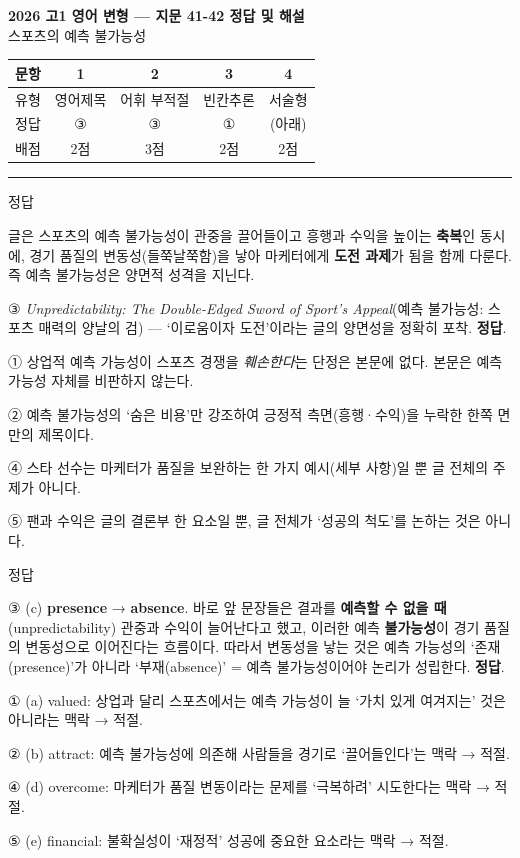 \documentclass[11pt,a4paper]{article}
\newcommand{\sol}[2]{\vspace{6pt}{\sffamily\bfseries #1} \quad 정답 \fbox{#2}\par\vspace{1pt}}
\begin{document}
\begin{center}
{\fontsize{15}{17}\selectfont\sffamily\bfseries 2026 고1 영어 변형 — 지문 41-42 정답 및 해설}\\[2pt]
{\sffamily 스포츠의 예측 불가능성}
\end{center}
\vspace{6pt}

\begin{center}
\renewcommand{\arraystretch}{1.4}
\begin{tabular}{|c|c|c|c|c|}
\hline
\sffamily 문항 & 1 & 2 & 3 & 4 \\\hline
\sffamily 유형 & \sffamily 영어제목 & \sffamily 어휘 부적절 & \sffamily 빈칸추론 & \sffamily 서술형 \\\hline
\sffamily 정답 & ③ & ③ & ① & (아래) \\\hline
\sffamily 배점 & 2점 & 3점 & 2점 & 2점 \\\hline
\end{tabular}
\end{center}
\vspace{8pt}\hrule\vspace{4pt}

\sol{1. 영어 제목}{③}
글은 스포츠의 예측 불가능성이 관중을 끌어들이고 흥행과 수익을 높이는 \textbf{축복}인 동시에, 경기 품질의 변동성(들쭉날쭉함)을 낳아 마케터에게 \textbf{도전 과제}가 됨을 함께 다룬다. 즉 예측 불가능성은 양면적 성격을 지닌다.\par
③ \textit{Unpredictability: The Double-Edged Sword of Sport's Appeal}(예측 불가능성: 스포츠 매력의 양날의 검) — `이로움이자 도전'이라는 글의 양면성을 정확히 포착. \textbf{정답}.\par
① 상업적 예측 가능성이 스포츠 경쟁을 \textit{훼손한다}는 단정은 본문에 없다. 본문은 예측 가능성 자체를 비판하지 않는다.\par
② 예측 불가능성의 `숨은 비용'만 강조하여 긍정적 측면(흥행·수익)을 누락한 한쪽 면만의 제목이다.\par
④ 스타 선수는 마케터가 품질을 보완하는 한 가지 예시(세부 사항)일 뿐 글 전체의 주제가 아니다.\par
⑤ 팬과 수익은 글의 결론부 한 요소일 뿐, 글 전체가 `성공의 척도'를 논하는 것은 아니다.

\vspace{4pt}
\sol{2. 어휘 부적절}{③}
③ (c) \textbf{presence} → \textbf{absence}. 바로 앞 문장들은 결과를 \textbf{예측할 수 없을 때}(unpredictability) 관중과 수익이 늘어난다고 했고, 이러한 예측 \textbf{불가능성}이 경기 품질의 변동성으로 이어진다는 흐름이다. 따라서 변동성을 낳는 것은 예측 가능성의 `존재(presence)'가 아니라 `부재(absence)' = 예측 불가능성이어야 논리가 성립한다. \textbf{정답}.\par
① (a) valued: 상업과 달리 스포츠에서는 예측 가능성이 늘 `가치 있게 여겨지는' 것은 아니라는 맥락 → 적절.\par
② (b) attract: 예측 불가능성에 의존해 사람들을 경기로 `끌어들인다'는 맥락 → 적절.\par
④ (d) overcome: 마케터가 품질 변동이라는 문제를 `극복하려' 시도한다는 맥락 → 적절.\par
⑤ (e) financial: 불확실성이 `재정적' 성공에 중요한 요소라는 맥락 → 적절.
\end{document}
